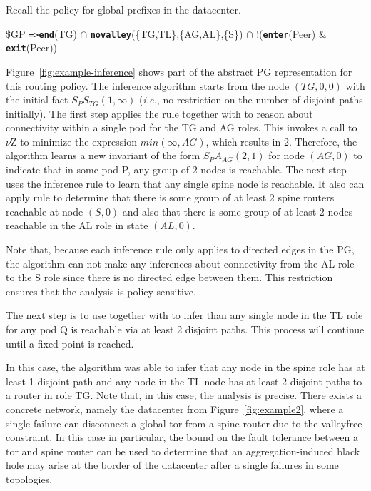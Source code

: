 \documentclass[numbers, 10pt, preprint]{sigplanconf}
\newcommand{\IE}{\emph{i.e.}}
\newcommand{\KW}[1]{\texttt{\small\bfseries{#1}}}
\newcommand{\Path}{\texttt{=>}}
\newcommand{\Exit}{\KW{exit}}
\newcommand{\End}{\KW{end}}
\newcommand{\Enter}{\KW{enter}}
\newcommand{\Novalley}{\KW{novalley}}
\begin{document}
Recall the policy for global prefixes in the datacenter.
%
\begin{code}
\$GP \Path \End(TG) \ensuremath{\cap}
       \Novalley(\{TG,TL\},\{AG,AL\},\{S\}) \ensuremath{\cap}
       !(\Enter(Peer) & \Exit(Peer))
\end{code}
\noindent
%
Figure~\ref{fig:example-inference} shows part of the abstract PG representation for this routing policy. The inference algorithm starts from the node $(TG,0,0)$ with the initial fact $S_P S_{TG}(1,\infty)$ (\IE, no restriction on the number of disjoint paths initially).
%
The first step applies the rule  together with  to reason about connectivity within a single pod for the TG and AG roles. This invokes a call to $\nu$Z to minimize the expression $min(\infty, AG)$, which results in 2. Therefore, the algorithm learns a new invariant of the form $S_P A_{AG} (2,1)$ for node $(AG, 0)$ to indicate that in some pod P, any group of 2 nodes is reachable.
%
The next step uses the inference rule  to learn that any single spine node is reachable. It also can apply rule  to determine that there is some group of at least 2 spine routers reachable at node $(S,0)$ and also that there is some group of at least 2 nodes reachable in the AL role in state $(AL,0)$.

Note that, because each inference rule only applies to directed edges in the PG, the algorithm can not make any inferences about connectivity from the AL role to the S role since there is no directed edge between them. This restriction ensures that the analysis is policy-sensitive.

The next step is to use  together with  to infer than any single node in the TL role for any pod Q is reachable via at least 2 disjoint paths. This process will continue until a fixed point is reached.

In this case, the algorithm was able to infer that any node in the spine role has at least 1 disjoint path and any node in the TL node has at least 2 disjoint paths to a router in role TG. Note that, in this case, the analysis is precise. There exists a concrete network, namely the datacenter from Figure~\ref{fig:example2}, where a single failure can disconnect a global tor from a spine router due to the valleyfree constraint. In this case in particular, the bound on the fault tolerance between a tor and spine router can be used to determine that an aggregation-induced black hole may arise at the border of the datacenter after a single failures in some topologies.
\end{document}
